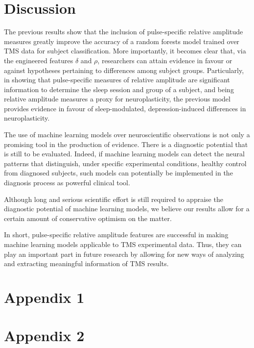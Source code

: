 \documentclass{article}
\begin{document}
\justifying
\begin{multicols}{2}



\section{Discussion}

The previous results show that the inclusion of pulse-specific relative
amplitude measures greatly improve the accuracy of a random forests model
trained over TMS data for subject classification. More importantly, it becomes
clear that, via the engineered features $\delta$ and $\rho$, researchers can
attain evidence in favour or against hypotheses pertaining to differences among
subject groups. Particularly, in showing that pulse-specific measures of
relative amplitude are significant information to determine the sleep session
and group of a subject, and being relative amplitude measures a proxy for
neuroplasticity, the previous model provides evidence in favour of
sleep-modulated, depression-induced differences in neuroplasticity.

The use of machine learning models over neuroscientific observations is not only
a promising tool in the production of evidence. There is a diagnostic potential
that is still to be evaluated. Indeed, if machine learning models can detect the
neural patterns that distinguish, under specific experimental conditions,
healthy control from diagnosed subjects, such models can potentially be
implemented in the diagnosis process as powerful clinical tool. 

Although long and serious scientific effort is still required to appraise the
diagnostic potential of machine learning models, we believe our results allow
for a certain amount of conservative optimism on the matter.

In short, pulse-specific relative amplitude features are successful in making
machine learning models applicable to TMS experimental data. Thus, they can play
an important part in future research by allowing for new ways of analyzing and
extracting meaningful information of TMS results.

\section{Appendix 1}



\section{Appendix 2}


\end{multicols}
\end{document}
